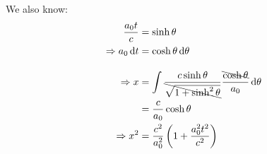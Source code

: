 \begin{parts}
	We also know:
	\begin{align*}
		\frac{a_0 t}{c} &= \sinh\theta \\
		\Rightarrow a_0 \,\mathrm{d}{t} &= \cosh\theta\,\mathrm{d}{\theta} \\[1em]
		\Rightarrow x &= \int {\frac{c \sinh\theta}{\bcancel{\sqrt{1+\sinh^2\theta}}} \frac{\bcancel{\cosh\theta}}{a_0}} \,\mathrm{d}{\theta} \\
		&= \frac{c}{a_0} \cosh\theta \\
		\Rightarrow x^2 &= \frac{c^2}{a_0^2} \left(1+\frac{a_0^2 t^2}{c^2}\right)
	\end{align*}
\end{parts}